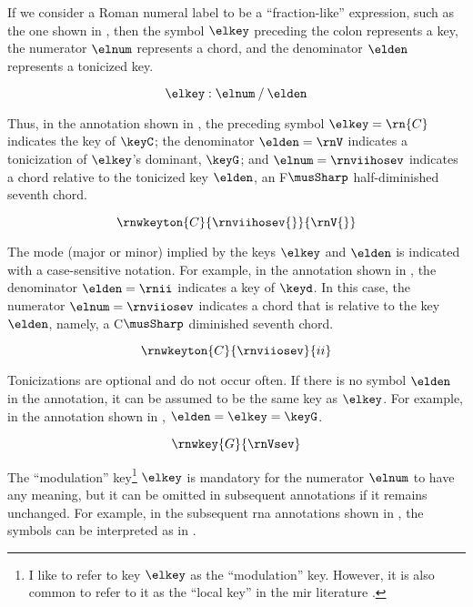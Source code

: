 
If we consider a Roman numeral label to be a
``fraction-like'' expression, such as the one shown in
, then the symbol $\elkey$ preceding
the colon represents a key, the numerator $\elnum$
represents a chord, and the denominator $\elden$ represents
a tonicized key.

\begin{equation}
    \label{eq:rn_expression}
    \elkey : \elnum \: / \: \elden
\end{equation}

Thus, in the annotation shown in , the
preceding symbol $\elkey=\rn{C}$ indicates the key of
$\keyC$; the denominator $\elden = \rnV$ indicates a
tonicization of $\elkey$'s dominant, $\keyG$; and
$\elnum=\rnviihosev$ indicates a chord relative to the
tonicized key $\elden$, an F$\musSharp$ half-diminished
seventh chord.

\begin{equation}
    \label{eq:rn_example1}
    \rnwkeyton{C}{\rnviihosev{}}{\rnV{}}
\end{equation}


The mode (major or minor) implied by the keys $\elkey$ and
$\elden$ is indicated with a case-sensitive notation. For
example, in the annotation shown in , the
denominator $\elden=\rnii$ indicates a key of $\keyd$. In
this case, the numerator $\elnum = \rnviiosev$ indicates a
chord that is relative to the key $\elden$, namely, a
C$\musSharp$ diminished seventh chord.

\begin{equation}
    \label{eq:rn_example2}
    \rnwkeyton{C}{\rnviiosev}{ii}
\end{equation}

Tonicizations are optional and do not occur often. If there
is no symbol $\elden$ in the annotation, it can be assumed
to be the same key as $\elkey$. For example, in the
annotation shown in , $\elden = \elkey =
\keyG$.

\begin{equation}
    \label{eq:rn_example3}
    \rnwkey{G}{\rnVsev}
\end{equation}

The ``modulation'' key\footnote{I like to refer to key
$\elkey$ as the ``modulation'' key. However, it is also
common to refer to it as the ``local key'' in the \gls{mir}
literature \parencite{napoleslopez2020local}.} $\elkey$ is
mandatory for the numerator $\elnum$ to have any meaning,
but it can be omitted in subsequent annotations if it
remains unchanged. For example, in the subsequent \gls{rna}
annotations shown in , the
symbols can be interpreted as in
.

